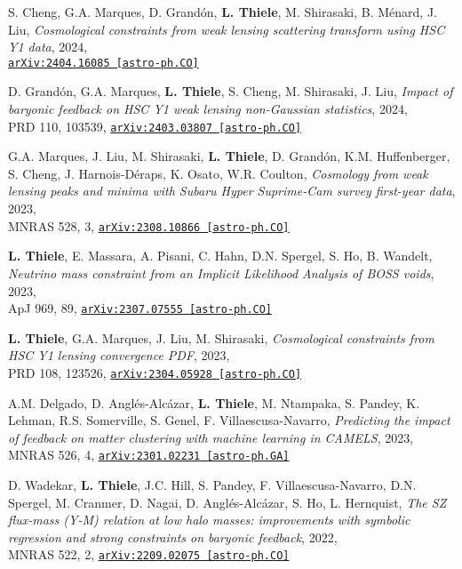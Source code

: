 \newpage
\vspace*{0.5cm}

S. Cheng, G.A. Marques, D. Grand\'on, {\bf L. Thiele}, M. Shirasaki, B. M\'enard, J. Liu,
\emph{Cosmological constraints from weak lensing scattering transform using HSC Y1 data}, 2024,\\
\href{https://arxiv.org/abs/2404.16085}{\mbox{\texttt{arXiv:2404.16085 [astro-ph.CO]}}}

D. Grand\'on, G.A. Marques, {\bf L. Thiele}, S. Cheng, M. Shirasaki, J. Liu,
\emph{Impact of baryonic feedback on HSC Y1 weak lensing non-Gaussian statistics}, 2024,\\
PRD 110, 103539,
\href{https://arxiv.org/abs/2403.03807}{\mbox{\texttt{arXiv:2403.03807 [astro-ph.CO]}}}

G.A. Marques, J. Liu, M. Shirasaki, {\bf L. Thiele}, D. Grand\'on, K.M. Huffenberger,
S. Cheng, J. Harnois-D\'eraps, K. Osato, W.R. Coulton,
\emph{Cosmology from weak lensing peaks and minima
      with Subaru Hyper Suprime-Cam survey first-year data}, 2023,\\
MNRAS 528, 3,
\href{https://arxiv.org/abs/2308.10866}{\mbox{\texttt{arXiv:2308.10866 [astro-ph.CO]}}}

{\bf L. Thiele}, E. Massara, A. Pisani, C. Hahn, D.N. Spergel, S. Ho, B. Wandelt,
\emph{Neutrino mass constraint from an Implicit Likelihood Analysis of BOSS voids}, 2023,\\
ApJ 969, 89,
\href{https://arxiv.org/abs/2307.07555}{\mbox{\texttt{arXiv:2307.07555 [astro-ph.CO]}}}

{\bf L. Thiele}, G.A. Marques, J. Liu, M. Shirasaki,
\emph{Cosmological constraints from HSC Y1 lensing convergence PDF}, 2023,\\
PRD 108, 123526,
\href{https://arxiv.org/abs/2304.05928}{\mbox{\texttt{arXiv:2304.05928 [astro-ph.CO]}}}

A.M. Delgado, D. Angl\'es-Alc\'azar, {\bf L. Thiele}, M. Ntampaka, S. Pandey,
K. Lehman, R.S. Somerville, S. Genel, F. Villaescusa-Navarro,
\emph{Predicting the impact of feedback on matter clustering with machine learning
      in CAMELS}, 2023,\\
MNRAS 526, 4,
\href{https://arxiv.org/abs/2301.02231}{\mbox{\texttt{arXiv:2301.02231 [astro-ph.GA]}}}

D. Wadekar, {\bf L. Thiele}, J.C. Hill, S. Pandey, F. Villaescusa-Navarro,
D.N. Spergel, M. Cranmer, D. Nagai, D. Angl\'es-Alc\'azar, S. Ho, L. Hernquist,
\emph{The SZ flux-mass (Y-M) relation at low halo masses: improvements with
      symbolic regression and strong constraints on baryonic feedback}, 2022,\\
MNRAS 522, 2,
\href{https://arxiv.org/abs/2209.02075}{\mbox{\texttt{arXiv:2209.02075 [astro-ph.CO]}}}

